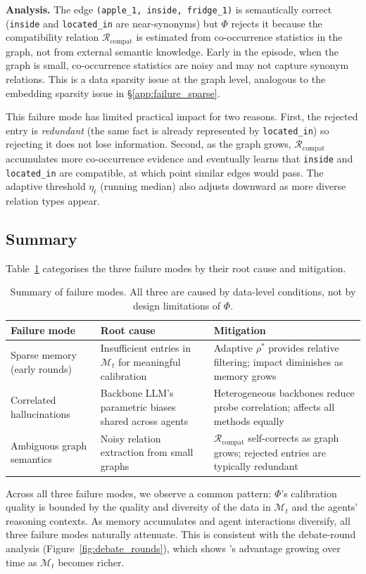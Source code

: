 \noindent
\textbf{Analysis.}
The edge \texttt{(apple\_1, inside, fridge\_1)} is
semantically correct (\texttt{inside} and
\texttt{located\_in} are near-synonyms) but $\Phi$
rejects it because the compatibility relation
$\mathcal{R}_{\text{compat}}$ is estimated from
co-occurrence statistics in the graph, not from
external semantic knowledge.  Early in the episode,
when the graph is small, co-occurrence statistics
are noisy and may not capture synonym relations.
This is a data sparsity issue at the graph level,
analogous to the embedding sparsity issue in
\S\ref{app:failure_sparse}.

This failure mode has limited practical impact for
two reasons.  First, the rejected entry is
\emph{redundant} (the same fact is already
represented by \texttt{located\_in}) so rejecting
it does not lose information.  Second, as the graph
grows, $\mathcal{R}_{\text{compat}}$ accumulates
more co-occurrence evidence and eventually learns
that \texttt{inside} and \texttt{located\_in} are
compatible, at which point similar edges would pass.
The adaptive threshold $\eta_t$ (running median)
also adjusts downward as more diverse relation types
appear.

\subsection{Summary}

Table~\ref{tab:failure_summary} categorises the
three failure modes by their root cause and
mitigation.

\begin{table}[h]
\centering
\caption{Summary of failure modes.  All three are
  caused by data-level conditions, not by design
  limitations of $\Phi$.}
\label{tab:failure_summary}
\small
\setlength{\tabcolsep}{3pt}
\begin{tabular}{p{2.2cm}|p{2.5cm}|p{2.8cm}}
\toprule
\textbf{Failure mode} & \textbf{Root cause} &
\textbf{Mitigation} \\
\midrule
Sparse memory (early rounds)
  & Insufficient entries in $\mathcal{M}_t$ for
    meaningful calibration
  & Adaptive $\rho^*$ provides relative filtering;
    impact diminishes as memory grows \\
\midrule
Correlated hallucinations
  & Backbone LLM's parametric biases shared across
    agents
  & Heterogeneous backbones reduce probe correlation;
    affects all methods equally \\
\midrule
Ambiguous graph semantics
  & Noisy relation extraction from small graphs
  & $\mathcal{R}_{\text{compat}}$ self-corrects as
    graph grows; rejected entries are typically
    redundant \\
\bottomrule
\end{tabular}
\end{table}

\noindent
Across all three failure modes, we observe a common
pattern: $\Phi$'s calibration quality is bounded by
the quality and diversity of the data in
$\mathcal{M}_t$ and the agents' reasoning contexts.
As memory accumulates and agent interactions
diversify, all three failure modes naturally
attenuate.  This is consistent with the debate-round
analysis (Figure~\ref{fig:debate_rounds}), which
shows \system's advantage growing over time as
$\mathcal{M}_t$ becomes richer.